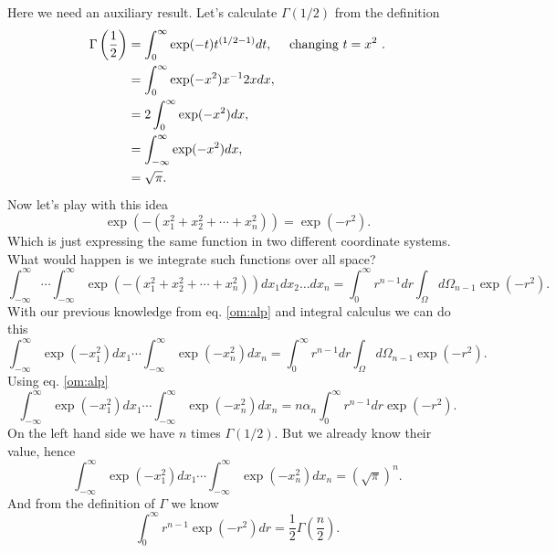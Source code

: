 \begin{questions}
\begin{solution}
  Here we need an auxiliary result. Let's calculate $\Gamma(1/2)$ from the definition
  \begin{equation}
    \begin{aligned}[b]
      \Gamma \left(\frac{1}{2} \right) &= \int_0^\infty \exp(-t)t^{(1/2 - 1)}dt, \quad\textnormal{  changing $t = x^2$ }.\\
      &= \int_0^\infty \exp(-x^2)x^{-1} 2xdx,\\
      &= 2 \int_0^\infty \exp(-x^2)dx, \\
      & =\int_{-\infty}^\infty \exp(-x^2)dx,\\
      & = \sqrt{\pi}.
    \end{aligned}
  \end{equation}
  Now let's play with this idea
  \begin{equation}
    \exp(-(x_1^2 +x_2^2 + \cdots + x_n^2)) = \exp{(-r^2)}.
    \label{exp:radial}
  \end{equation}
  Which is just expressing the same function in two different coordinate systems. What would happen is we integrate such functions over all space?
  \begin{equation}
    \int_{-\infty}^\infty \cdots \int_{-\infty}^\infty \exp(-(x_1^2 +x_2^2 + \cdots + x_n^2)) dx_1dx_2\ldots dx_n = \int_{0}^\infty r^{n-1}dr \int_\Omega d\Omega_{n-1} \exp{(-r^2)}.
  \end{equation}
  With our previous knowledge from eq. \ref{om:alp} and integral calculus we can do this
  \begin{equation}
    \int_{-\infty}^\infty \exp{(-x_1^2)}dx_1\cdots \int_{-\infty}^\infty \exp{(-x_n^2)}dx_n = \int_{0}^\infty r^{n-1}dr \int_\Omega d\Omega_{n-1} \exp{(-r^2)}.
  \end{equation}
  Using eq. \ref{om:alp}
  \begin{equation*}
    \int_{-\infty}^\infty \exp{(-x_1^2)}dx_1\cdots \int_{-\infty}^\infty \exp{(-x_n^2)}dx_n = n\alpha_n\int_{0}^\infty r^{n-1}dr \exp{(-r^2)}.
  \end{equation*}
  On the left hand side we have $n$ times $\Gamma(1/2)$. But we already know their value, hence
  \begin{equation}
    \int_{-\infty}^\infty \exp{(-x_1^2)}dx_1\cdots \int_{-\infty}^\infty \exp{(-x_n^2)}dx_n = (\sqrt{\pi})^n.
  \end{equation}
  And from the definition of $\Gamma$ we know
  \begin{equation}
    \int_0^\infty r^{n-1}\exp{(-r^2)} dr = \frac{1}{2} \Gamma \left(\frac{n}{2}\right).

\end{equation}
\end{solution}
\end{questions}
